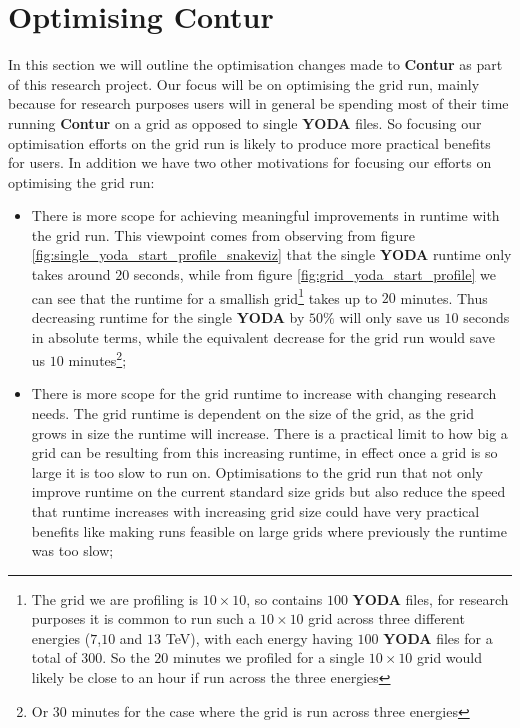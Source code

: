 \chapter{Optimising Contur}
\label{chapterlabel5}
In this section we will outline the optimisation changes made to \textbf{Contur} as part of this research project. Our focus will be on optimising the grid run, mainly because for research purposes users will in general be spending most of their time running \textbf{Contur} on a grid as opposed to single \textbf{YODA} files. So focusing our optimisation efforts on the grid run is likely to produce more practical benefits for users. In addition we have two other motivations for focusing our efforts on optimising the grid run:

\begin{itemize}
\item There is more scope for achieving meaningful improvements in runtime with the grid run. This viewpoint comes from observing from figure \ref{fig:single_yoda_start_profile_snakeviz} that the single \textbf{YODA} runtime only takes around $20$ seconds, while from figure \ref{fig:grid_yoda_start_profile} we can see that the runtime for a smallish grid\footnote{The grid we are profiling is $10 \times 10$, so contains $100$ \textbf{YODA} files, for research purposes it is common to run such a $10 \times 10$ grid across three different energies ($7$,$10$ and $13$ TeV), with each energy having $100$ \textbf{YODA} files for a total of $300$. So the $20$ minutes we profiled for a single $10 \times 10$ grid would likely be close to an hour if run across the three energies} takes up to $20$ minutes. Thus decreasing runtime for the single \textbf{YODA}  by $50\%$ will only save us $10$ seconds in absolute terms, while the equivalent decrease for the grid run would save us $10$ minutes\footnote{Or $30$ minutes for the case where the grid is run across three energies};
\item There is more scope for the grid runtime to increase with changing research needs. The grid runtime is dependent on the size of the grid, as the grid grows in size the runtime will increase. There is a practical limit to how big a grid can be resulting from this increasing runtime, in effect once a grid is so large it is too slow to run on. Optimisations to the grid run that not only improve runtime on the current standard size grids but also reduce the speed that runtime increases with increasing grid size could have very practical benefits like making runs feasible on large grids where previously the runtime was too slow;
\end{itemize}

